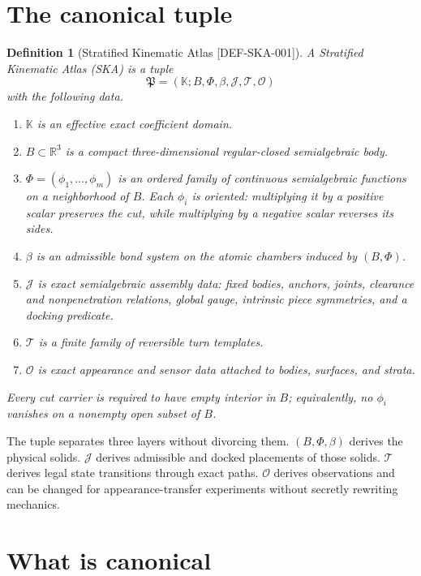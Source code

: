 \documentclass[11pt,openany]{book}
\newcommand{\R}{\mathbb R}
\newcommand{\K}{\mathbb K}
\newcommand{\Atlas}{\mathfrak P}
\newcommand{\Turns}{\mathcal T}
\newcommand{\claimid}[1]{\textnormal{\sffamily\footnotesize[#1]}}
\theoremstyle{polyplain}
\theoremstyle{polydef}
\newtheorem{definition}[theorem]{Definition}
\begin{document}
\section{The canonical tuple}

\begin{definition}[Stratified Kinematic Atlas \claimid{DEF-SKA-001}]
\label{def:ska}
A \emph{Stratified Kinematic Atlas} (SKA) is a tuple
\[
\Atlas=(\K;B,\Phi,\beta,\mathcal J,\Turns,\mathcal O)
\]
with the following data.
\begin{enumerate}
  \item $\K$ is an effective exact coefficient domain.
  \item $B\subset\R^3$ is a compact three-dimensional regular-closed semialgebraic body.
  \item $\Phi=(\phi_1,\ldots,\phi_m)$ is an ordered family of continuous semialgebraic functions on a neighborhood of $B$. Each $\phi_i$ is oriented: multiplying it by a positive scalar preserves the cut, while multiplying by a negative scalar reverses its sides.
  \item $\beta$ is an admissible bond system on the atomic chambers induced by $(B,\Phi)$.
  \item $\mathcal J$ is exact semialgebraic assembly data: fixed bodies, anchors, joints, clearance and nonpenetration relations, global gauge, intrinsic piece symmetries, and a docking predicate.
  \item $\Turns$ is a finite family of reversible turn templates.
  \item $\mathcal O$ is exact appearance and sensor data attached to bodies, surfaces, and strata.
\end{enumerate}
Every cut carrier is required to have empty interior in $B$; equivalently, no $\phi_i$ vanishes on a nonempty open subset of $B$.
\end{definition}

The tuple separates three layers without divorcing them. $(B,\Phi,\beta)$ derives the physical solids. $\mathcal J$ derives admissible and docked placements of those solids. $\Turns$ derives legal state transitions through exact paths. $\mathcal O$ derives observations and can be changed for appearance-transfer experiments without secretly rewriting mechanics.

\section{What is canonical}
\end{document}
